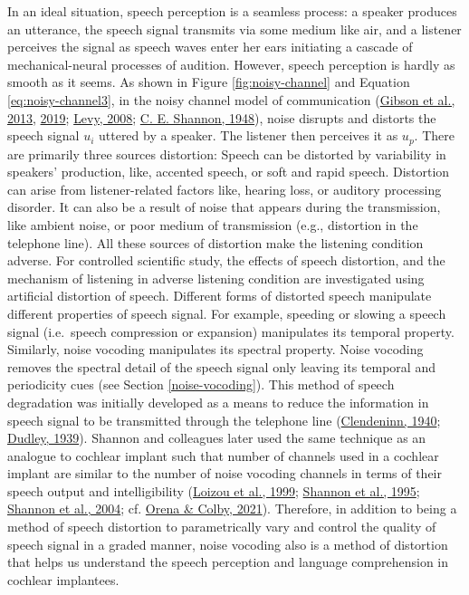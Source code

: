 \documentclass[a4paper, nobind]{templates/ociamthesis}
\begin{document}
In an ideal situation, speech perception is a seamless process: a speaker produces an utterance, the speech signal transmits via some medium like air, and a listener perceives the signal as speech waves enter her ears initiating a cascade of mechanical-neural processes of audition.
However, speech perception is hardly as smooth as it seems.
As shown in Figure \ref{fig:noisy-channel} and Equation \eqref{eq:noisy-channel3}, in the noisy channel model of communication (\protect\hyperlink{ref-Gibson2013}{Gibson et al., 2013}, \protect\hyperlink{ref-Gibson2019}{2019}; \protect\hyperlink{ref-Levy2008}{Levy, 2008}; \protect\hyperlink{ref-Shannon1948}{C. E. Shannon, 1948}),
noise disrupts and distorts the speech signal \(u_i\) uttered by a speaker.
The listener then perceives it as \(u_p\).
There are primarily three sources distortion:
Speech can be distorted by variability in speakers' production, like, accented speech, or soft and rapid speech.
Distortion can arise from listener-related factors like, hearing loss, or auditory processing disorder.
It can also be a result of noise that appears during the transmission, like ambient noise, or poor medium of transmission (e.g., distortion in the telephone line).
All these sources of distortion make the listening condition adverse.
For controlled scientific study, the effects of speech distortion, and the mechanism of listening in adverse listening condition are investigated using artificial distortion of speech.
Different forms of distorted speech manipulate different properties of speech signal.
For example, speeding or slowing a speech signal (i.e.~speech compression or expansion) manipulates its temporal property.
Similarly, noise vocoding manipulates its spectral property.
Noise vocoding removes the spectral detail of the speech signal only leaving its temporal and periodicity cues (see Section \ref{noise-vocoding}).
This method of speech degradation was initially developed as a means to reduce the information in speech signal to be transmitted through the telephone line (\protect\hyperlink{ref-Vocoder1940}{Clendeninn, 1940}; \protect\hyperlink{ref-Dudley1939}{Dudley, 1939}).
Shannon and colleagues later used the same technique as an analogue to cochlear implant such that number of channels used in a cochlear implant are similar to the number of noise vocoding channels in terms of their speech output and intelligibility (\protect\hyperlink{ref-Loizou1999}{Loizou et al., 1999}; \protect\hyperlink{ref-Shannon1995}{Shannon et al., 1995}; \protect\hyperlink{ref-Shannon2004}{Shannon et al., 2004}; cf. \protect\hyperlink{ref-Orena2021}{Orena \& Colby, 2021}).
Therefore, in addition to being a method of speech distortion to parametrically vary and control the quality of speech signal in a graded manner, noise vocoding also is a method of distortion that helps us understand the speech perception and language comprehension in cochlear implantees.
\end{document}

